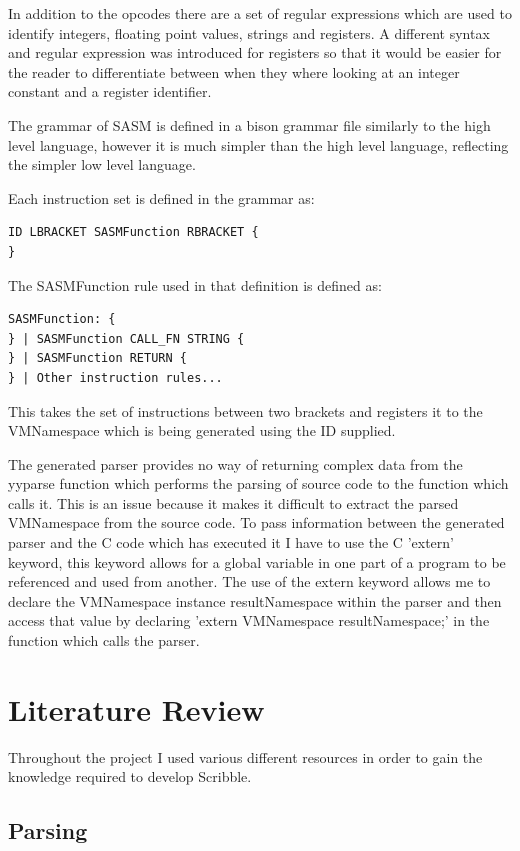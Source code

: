 \documentclass[]{final_report}
\begin{document}
In addition to the opcodes there are a set of regular expressions which are used to identify integers, floating point values, strings and registers. A different syntax and regular expression was introduced for registers so that it would be easier for the reader to differentiate between when they where looking at an integer constant and a register identifier.

The grammar of SASM is defined in a bison grammar file similarly to the high level language, however it is  much simpler than the high level language, reflecting the simpler low level language. 

Each instruction set is defined in the grammar as:
\begin{verbatim}
ID LBRACKET SASMFunction RBRACKET {
}
\end{verbatim}

The SASMFunction rule used in that definition is defined as:
\begin{verbatim}
SASMFunction: {
} | SASMFunction CALL_FN STRING {
} | SASMFunction RETURN {
} | Other instruction rules...
\end{verbatim}

This takes the set of instructions between two brackets and registers it to the VMNamespace which is being generated using the ID supplied.

The generated parser provides no way of returning complex data from the yyparse function which  performs the parsing of source code to the function which calls it. This is an issue because it makes it difficult to extract the parsed VMNamespace from the source code. To pass information between the generated parser and the C code which has executed it I have to use the C 'extern' keyword, this keyword allows for a global variable in one part of a program to be referenced and used from another. The use of the extern keyword allows me to declare the VMNamespace instance resultNamespace within the parser and then access that value by declaring 'extern VMNamespace resultNamespace;' in the function which calls the parser.

\chapter{Literature Review}

Throughout the project I used various different resources in order to gain the knowledge required to develop Scribble.

\section{Parsing}
\end{document}
